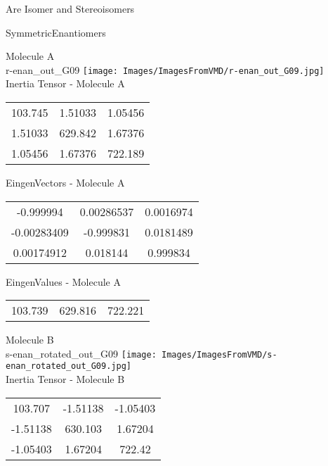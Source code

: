\begin{center}
\vtab
\vtab
\textcolor{NavyBlue}{\Large Are Isomer and Stereoisomers}
\end{center}
\newpage

\vtab[-2cm]
\begin{center}
{\large SymmetricEnantiomers}
\end{center}
\begin{multicols}{2}
\begin{center}
Molecule A \\ 
r-enan\_out\_G09
\texttt{[image: Images/ImagesFromVMD/r-enan\_out\_G09.jpg]}
\\
Inertia Tensor - Molecule A \\
\vtab
\begin{tabular}{|c c c|}
103.745	 & 	1.51033	 & 	1.05456	 \\
1.51033	 & 	629.842	 & 	1.67376	 \\
1.05456	 & 	1.67376	 & 	722.189
\end{tabular}

\vtab
 EingenVectors - Molecule A     \\
\vtab
\begin{tabular}{|c c c|}
-0.999994	 & 	0.00286537	 & 	0.0016974	 \\
-0.00283409	 & 	-0.999831	 & 	0.0181489	 \\
0.00174912	 & 	0.018144	 & 	0.999834
\end{tabular}

\vtab
 EingenValues - Molecule A     \\
\vtab
\begin{tabular}{|c c c|}
103.739	 & 	629.816	 & 	722.221
\end{tabular}
\columnbreak

Molecule B \\ 
s-enan\_rotated\_out\_G09
\texttt{[image: Images/ImagesFromVMD/s-enan\_rotated\_out\_G09.jpg]}
\\
Inertia Tensor - Molecule B \\
\vtab
\begin{tabular}{|c c c|}
103.707	 & 	-1.51138	 & 	-1.05403	 \\
-1.51138	 & 	630.103	 & 	1.67204	 \\
-1.05403	 & 	1.67204	 & 	722.42
\end{tabular}


\end{center}
\end{multicols}
